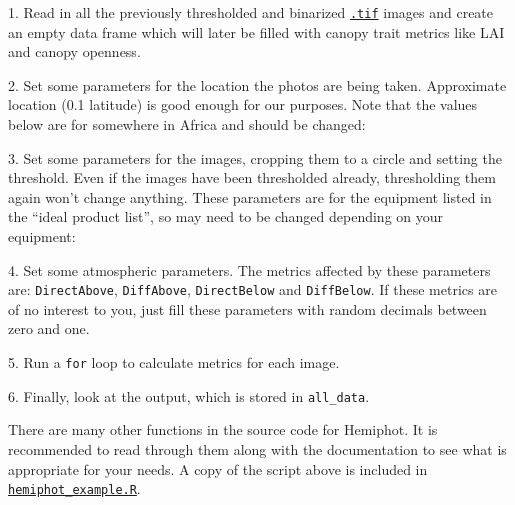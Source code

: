 \documentclass[11pt,a4paper]{article}
\newcommand\file[1]{\texttt{\underline{#1}}}
\begin{document}
\begin{minipage}{\linewidth}
1. Read in all the previously thresholded and binarized \file{.tif} images and create an empty data frame which will later be filled with canopy trait metrics like LAI and canopy openness.

\end{minipage}


\begin{minipage}{\linewidth}
	2. Set some parameters for the location the photos are being taken. Approximate location (0.1\textdegree{} latitude) is good enough for our purposes. Note that the values below are for somewhere in Africa and should be changed:

\end{minipage}


\begin{minipage}{\linewidth}
3. Set some parameters for the images, cropping them to a circle and setting the threshold. Even if the images have been thresholded already, thresholding them again won't change anything. These parameters are for the equipment listed in the ``ideal product list'', so may need to be changed depending on your equipment:

\end{minipage}


\begin{minipage}{\linewidth}
4. Set some atmospheric parameters. The metrics affected by these parameters are: \verb|DirectAbove|, \verb|DiffAbove|, \verb|DirectBelow| and \verb|DiffBelow|. If these metrics are of no interest to you, just fill these parameters with random decimals between zero and one.

\end{minipage}


\begin{minipage}{\linewidth}
5. Run a \verb|for| loop to calculate metrics for each image.

\end{minipage}

6. Finally, look at the output, which is stored in \verb|all_data|.

There are many other functions in the source code for Hemiphot. It is recommended to read through them along with the documentation to see what is appropriate for your needs. A copy of the script above is included in \file{hemiphot\_example.R}.
\end{document}
